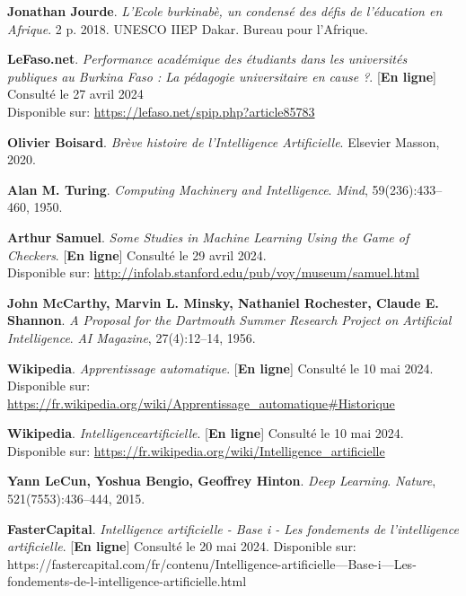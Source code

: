 \adjustmtc
\renewcommand\bibname{BIBLIOGRAPHIE}
\begin{thebibliography}{9}
\thispagestyle{MyStyle}

\textbf{Jonathan Jourde}. \emph{L'Ecole burkinabè, un condensé des défis de l'éducation en Afrique}. 2 p. 2018. UNESCO IIEP Dakar. Bureau pour l’Afrique.

\textbf{LeFaso.net}. \emph{Performance académique des étudiants dans les universités publiques au Burkina Faso : La pédagogie universitaire en cause ?}. [\textbf{En ligne}] Consulté le 27 avril 2024 \\Disponible sur:
\url{https://lefaso.net/spip.php?article85783}

\textbf{Olivier Boisard}. \emph{Brève histoire de l’Intelligence Artificielle}. Elsevier Masson, 2020.

\textbf{Alan M. Turing}. \emph{Computing Machinery and Intelligence}. \emph{Mind}, 59(236):433--460, 1950.

\textbf{Arthur Samuel}. \emph{Some Studies in Machine Learning Using the Game of Checkers}. [\textbf{En ligne}] Consulté le 29 avril 2024. \\ Disponible sur:
\url{http://infolab.stanford.edu/pub/voy/museum/samuel.html}

\textbf{John McCarthy, Marvin L. Minsky, Nathaniel Rochester, Claude E. Shannon}. \emph{A Proposal for the Dartmouth Summer Research Project on Artificial Intelligence}. \emph{AI Magazine}, 27(4):12--14, 1956.

\textbf{Wikipedia}. \emph{Apprentissage automatique}. [\textbf{En ligne}] Consulté le 10 mai 2024. \\Disponible sur:
\url{https://fr.wikipedia.org/wiki/Apprentissage_automatique#Historique}

\textbf{Wikipedia}. \emph{Intelligenceartificielle}. [\textbf{En ligne}] Consulté le 10 mai 2024. \\Disponible sur:
\url{https://fr.wikipedia.org/wiki/Intelligence_artificielle}

\textbf{Yann LeCun, Yoshua Bengio, Geoffrey Hinton}. \emph{Deep Learning}. \emph{Nature}, 521(7553):436--444, 2015.

\textbf{FasterCapital}. \emph{Intelligence artificielle - Base i - Les fondements de l'intelligence artificielle}. [\textbf{En ligne}] Consulté le 20 mai 2024. Disponible sur:
https://fastercapital.com/fr/contenu/Intelligence-artificielle---Base-i---Les-\\fondements-de-l-intelligence-artificielle.html



\end{thebibliography}
